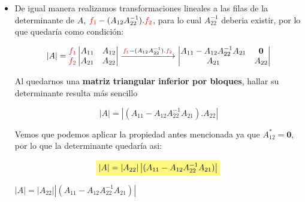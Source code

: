 \documentclass[12pt]{article}
\newcommand{\highlight}[2][yellow]{\mathchoice%
  {\colorbox{#1}{$\displaystyle#2$}}%
  {\colorbox{#1}{$\textstyle#2$}}%
  {\colorbox{#1}{$\scriptstyle#2$}}%
  {\colorbox{#1}{$\scriptscriptstyle#2$}}}%
\begin{document}
\begin{itemize}
    
    \item De igual manera realizamos transformaciones lineales a las filas de la determinante de $A$,  $\color{red} f_1 \color{black} - (A_{12} A_{22}^{-1}). \color{red} f_2 \color{black}$, para lo cual $ A_{22}^{-1}$ deberia existir, por lo que quedaría como condición:

    \begin{equation*}
        \left | A \right | = \begin{matrix} \color{red} f_1 \\ \color{red} f_2 \end{matrix} \begin{vmatrix} A_{11} & A_{12}\\ A_{21} & A_{22} \end{vmatrix} \xrightarrow{ \color{red} f_1 \color{black} - (A_{12} A_{22}^{-1}). \color{red} f_2 \color{black}} \begin{vmatrix} A_{11} - A_{12} A_{22}^{-1} A_{21} & \textbf{0} \\ A_{21} & A_{22} \end{vmatrix}
    \end{equation*}

    Al quedarnos una \textbf{matriz triangular inferior por bloques}, hallar su determinante resulta más sencillo

    \begin{equation*}
        \left | A \right | = \left | (A_{11} - A_{12} A_{22}^{-1} A_{21}). A_{22} \right | 
    \end{equation*}

    Vemos que podemos aplicar la propiedad antes mencionada ya que $A_{12}^{*} = \textbf{0}$, por lo que la determinante quedaría asi:

    \begin{equation*}
        \highlight[yellow!50!white]{\left | A \right | = \left | A_{22} \right | \left | (A_{11} - A_{12} A_{22}^{-1} A_{21}) \right |}
    \end{equation*}
    
    \begin{center}
    \begin{tcolorbox}[colback=blue!10!white ,colframe=white,width=10 cm]
        \center \large $\left | A \right | = \left | A_{22} \right | \left | (A_{11} - A_{12} A_{22}^{-1} A_{21}) \right |$
    \end{tcolorbox}
    \end{center}

\end{itemize}
\end{document}
